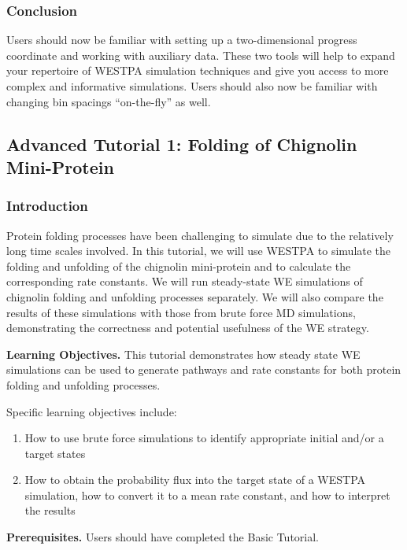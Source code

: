 \documentclass[9pt,tutorial]{livecoms}
\begin{document}
\subsubsection{Conclusion}

Users should now be familiar with setting up a two-dimensional progress coordinate and working with auxiliary data. 
These two tools will help to expand your repertoire of WESTPA simulation techniques and give you access to more complex and informative simulations. 
Users should also now be familiar with changing bin spacings “on-the-fly” as well. 

\subsection{Advanced Tutorial 1: Folding of Chignolin Mini-Protein}

\subsubsection{Introduction}

Protein folding processes have been challenging to simulate due to the relatively long time scales involved. 
In this tutorial, we will use WESTPA to simulate the folding and unfolding of the chignolin mini-protein and to calculate the corresponding rate constants. 
We will run steady-state WE simulations of chignolin folding and unfolding processes separately. 
We will also compare the results of these simulations with those from brute force MD simulations, demonstrating the correctness and potential usefulness of the WE strategy. 
 
\textbf{Learning Objectives.} This tutorial demonstrates how steady state WE simulations can be used to generate pathways and rate constants for both protein folding and unfolding processes.  

Specific learning objectives include:
\begin{enumerate}
\item How to use brute force simulations to identify appropriate initial and/or a target states
\item How to obtain the probability flux into the target state of a WESTPA simulation, how to convert it to a mean rate constant, and how to interpret the results
\end{enumerate}

\textbf{Prerequisites.} Users should have completed the Basic Tutorial.
 
\end{document}

